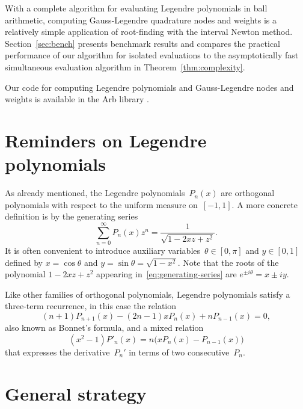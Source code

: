 \documentclass[11pt,a4paper]{article}
\begin{document}
With a complete algorithm for evaluating Legendre polynomials
in ball arithmetic,
computing Gauss-Legendre quadrature nodes and weights
is a relatively simple application of root-finding with the
interval Newton method.
Section~\ref{sec:bench} presents benchmark results
and compares the practical performance
of our algorithm for isolated evaluations
to the asymptotically fast simultaneous evaluation
algorithm in Theorem~\ref{thm:complexity}.

Our code for computing Legendre polynomials and
Gauss-Legendre nodes and weights is available
in the Arb library \cite{Johansson2017arb}.

\section{Reminders on Legendre polynomials}

\label{sec:reminders}

As already mentioned, the Legendre polynomials~$P_n(x)$ are orthogonal
polynomials with respect to the uniform measure on~$[-1,1]$.
A more concrete definition is by the generating series
\begin{equation} \label{eq:generating-series}
  \sum_{n=0}^{\infty} P_n(x) z^n
  = \frac{1}{\sqrt{1 - 2 x z + z^2}}.
\end{equation}
It is often convenient to introduce auxiliary
variables~$\theta \in [0, \pi]$ and $y \in [0, 1]$ defined by
$x = \cos \theta$ and $y = \sin \theta = \sqrt{1 - x^2}$.
Note that the roots of the polynomial $1 - 2 x z + z^2$ appearing
in \eqref{eq:generating-series} are $e^{\pm i \theta} = x \pm i y$.

Like other families of orthogonal polynomials, Legendre polynomials
satisfy a three-term recurrence, in this case the relation
\begin{equation} \label{eq:recurrence}
  (n + 1) P_{n+1}(x) - (2n - 1) x P_n(x) + n P_{n-1}(x) = 0,
\end{equation}
also known as Bonnet's formula, and a mixed relation
\begin{equation} \label{eq:mixed}
  (x^2 - 1) P'_n(x) = n \bigl( x P_n(x) - P_{n-1}(x) \bigl)
\end{equation}
that expresses the derivative $P_n'$ in terms of two
consecutive $P_n$.

\section{General strategy}
\end{document}
